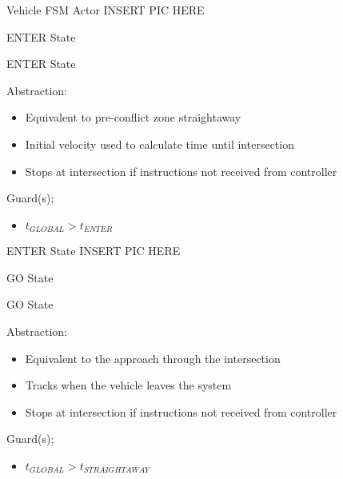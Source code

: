 \documentclass{beamer}
\begin{document}
\begin{frame}{Vehicle FSM Actor}
INSERT PIC HERE
\end{frame}

\begin{frame}{ENTER State}
\begin{block}{ENTER State}
\begin{minipage}{0.45\linewidth}
Abstraction:
\begin{itemize}
\item Equivalent to pre-conflict zone straightaway 
\item Initial velocity used to calculate time until intersection
\item Stops at intersection if instructions not received from controller
\end{itemize}
\end{minipage}
\hfill
\begin{minipage}{0.45\linewidth}
Guard(s);
\begin{itemize}
\item $t_{GLOBAL} > t_{ENTER}$
\end{itemize}
\end{minipage}
\end{block}
\end{frame}

\begin{frame}{ENTER State}
INSERT PIC HERE
\end{frame}

\begin{frame}{GO State}
\begin{block}{GO State}
\begin{minipage}{0.45\linewidth}
Abstraction:
\begin{itemize}
\item Equivalent to the approach through the intersection
\item Tracks when the vehicle leaves the system
\item Stops at intersection if instructions not received from controller
\end{itemize}
\end{minipage}
\hfill
\begin{minipage}{0.45\linewidth}
Guard(s);
\begin{itemize}
\item $t_{GLOBAL} > t_{STRAIGHTAWAY}$
\end{itemize}
\end{minipage}
\end{block}
\end{frame}
\end{document}
